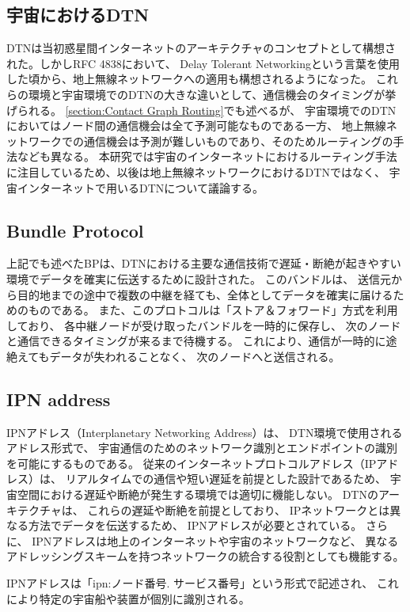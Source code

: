 \subsection{宇宙におけるDTN}
DTNは当初惑星間インターネットのアーキテクチャのコンセプトとして構想された。しかしRFC 4838\cite{rfc4838}において、
Delay Tolerant Networkingという言葉を使用した頃から、地上無線ネットワークへの適用も構想されるようになった。
これらの環境と宇宙環境でのDTNの大きな違いとして、通信機会のタイミングが挙げられる。
\ref{section:Contact Graph Routing}でも述べるが、
宇宙環境でのDTNにおいてはノード間の通信機会は全て予測可能なものである一方、
地上無線ネットワークでの通信機会は予測が難しいものであり、そのためルーティングの手法なども異なる。
本研究では宇宙のインターネットにおけるルーティング手法に注目しているため、以後は地上無線ネットワークにおけるDTNではなく、
宇宙インターネットで用いるDTNについて議論する。

\subsection{Bundle Protocol}
\label{subsection:Bundle Protocol}
上記でも述べたBPは、DTNにおける主要な通信技術で遅延・断絶が起きやすい環境でデータを確実に伝送するために設計された。
このバンドルは、 送信元から目的地までの途中で複数の中継を経ても、全体としてデータを確実に届けるためのものである。 
また、このプロトコルは「ストア＆フォワード」方式を利用しており、 各中継ノードが受け取ったバンドルを一時的に保存し、 
次のノードと通信できるタイミングが来るまで待機する。 これにより、通信が一時的に途絶えてもデータが失われることなく、 次のノードへと送信される。

\subsection{IPN address}
\label{subsection:IPN address}
IPNアドレス（Interplanetary Networking Address）は、 DTN環境で使用されるアドレス形式で、
宇宙通信のためのネットワーク識別とエンドポイントの識別を可能にするものである。 従来のインターネットプロトコルアドレス（IPアドレス）は、
リアルタイムでの通信や短い遅延を前提とした設計であるため、 宇宙空間における遅延や断絶が発生する環境では適切に機能しない。
DTNのアーキテクチャは、 これらの遅延や断絶を前提としており、 IPネットワークとは異なる方法でデータを伝送するため、
IPNアドレスが必要とされている。 さらに、 IPNアドレスは地上のインターネットや宇宙のネットワークなど、
異なるアドレッシングスキームを持つネットワークの統合する役割としても機能する。

IPNアドレスは「ipn:ノード番号. サービス番号」という形式で記述され、 これにより特定の宇宙船や装置が個別に識別される。 

